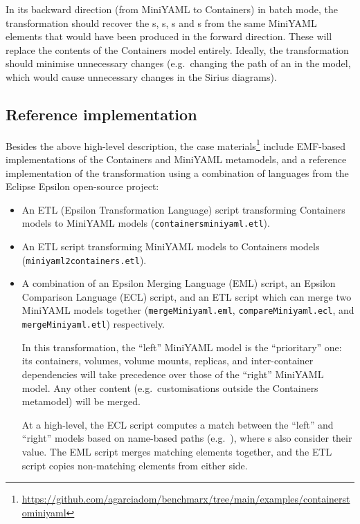 \documentclass[twocolumn]{ceurart}
\begin{document}
In its backward direction (from MiniYAML to Containers) in batch mode, the
transformation should recover the s, s,
s and s from the same MiniYAML elements
that would have been produced in the forward direction. These will replace the
contents of the Containers model entirely. Ideally, the transformation should
minimise unnecessary changes (e.g.\ changing the path of an  in
the model, which would cause unnecessary changes in the Sirius diagrams).

\subsection{Reference implementation}

\newcommand*{\file}[1]{\texttt{#1}}

Besides the above high-level description, the case materials\footnote{\url{https://github.com/agarciadom/benchmarx/tree/main/examples/containerstominiyaml}} include EMF-based
implementations of the Containers and MiniYAML metamodels, and a reference
implementation of the transformation using a combination of languages from the
Eclipse Epsilon open-source project:

\begin{itemize}
\item An ETL (Epsilon Transformation Language) script transforming Containers
  models to MiniYAML models (\file{con\-tai\-ners\-miniyaml.etl}).

\item An ETL script transforming MiniYAML models to Containers models
  (\file{miniyaml2containers.etl}).

\item A combination of an Epsilon Merging Language (EML) script, an Epsilon
  Comparison Language (ECL) script, and an ETL script which can merge two
  MiniYAML models together (\file{mergeMiniyaml.eml},
  \file{compareMiniyaml.ecl}, and \file{mergeMiniyaml.etl}) respectively.

  In this transformation, the ``left'' MiniYAML model is the ``prioritary'' one:
  its containers, volumes, volume mounts, replicas, and inter-container
  dependencies will take precedence over those of the ``right'' MiniYAML model.
  Any other content (e.g.\ customisations outside the Containers metamodel) will
  be merged.

  At a high-level, the ECL script computes a match between the ``left'' and
  ``right'' models based on name-based paths
  (e.g.\ ), where s also
  consider their value. The EML script merges matching elements together, and
  the ETL script copies non-matching elements from either side.
\end{itemize}
\end{document}

